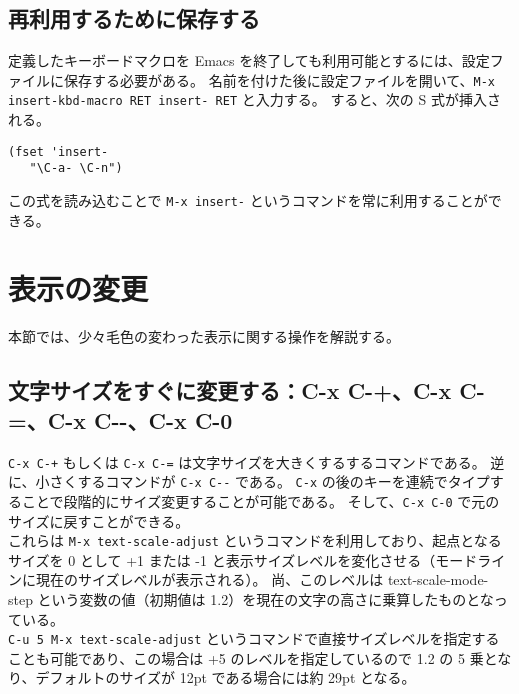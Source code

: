\subsection{再利用するために保存する}
定義したキーボードマクロを Emacs を終了しても利用可能とするには、設定ファイルに保存する必要がある。
名前を付けた後に設定ファイルを開いて、\texttt{M-x insert-kbd-macro RET insert- RET} と入力する。
すると、次の S 式が挿入される。
\begin{mdframed}[roundcorner=0.50zw,leftmargin=3.00zw,rightmargin=3.00zw,skipabove=0.40zw,skipbelow=0.40zw,innertopmargin=4.00pt,innerbottommargin=4.00pt,innerleftmargin=5.00pt,innerrightmargin=5.00pt,linecolor=gray!020,linewidth=0.50pt,backgroundcolor=gray!20]
\begin{verbatim}
(fset 'insert-
   "\C-a- \C-n")
\end{verbatim}
\end{mdframed}
この式を読み込むことで \texttt{M-x insert-} というコマンドを常に利用することができる。
\section{表示の変更}
本節では、少々毛色の変わった表示に関する操作を解説する。
\subsection{文字サイズをすぐに変更する：C-x C-+、C-x C-=、C-x C-{}-、C-x C-0}
\texttt{C-x C-+} もしくは \texttt{C-x C-=} は文字サイズを大きくするするコマンドである。
逆に、小さくするコマンドが \texttt{C-x C-{}-} である。
\texttt{C-x} の後のキーを連続でタイプすることで段階的にサイズ変更することが可能である。
そして、\texttt{C-x C-0} で元のサイズに戻すことができる。\\

これらは \texttt{M-x text-scale-adjust} というコマンドを利用しており、起点となるサイズを 0 として +1 または -1 と表示サイズレベルを変化させる（モードラインに現在のサイズレベルが表示される）。
尚、このレベルは text-scale-mode-step という変数の値（初期値は 1.2）を現在の文字の高さに乗算したものとなっている。\\

\texttt{C-u 5 M-x text-scale-adjust} というコマンドで直接サイズレベルを指定することも可能であり、この場合は +5 のレベルを指定しているので 1.2 の 5 乗となり、デフォルトのサイズが 12pt である場合には約 29pt となる。
